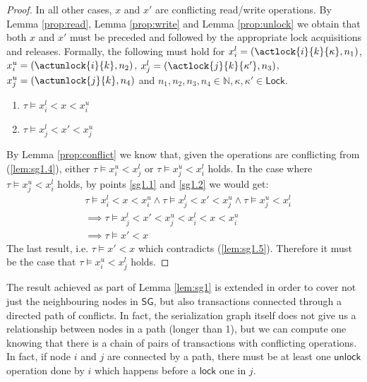 \begin{lem}
\begin{proof}
	In all other cases, $x$ and $x'$ are conflicting read/write operations. By Lemma \ref{prop:read}, Lemma \ref{prop:write} and Lemma \ref{prop:unlock} we obtain that both $x$ and $x'$ must be preceded and followed by the appropriate lock acquisitions and releases. Formally, the following must hold for $x_i^l = (\actlock{i}{k}{\kappa}, n_1)$, $x_i^u = (\actunlock{i}{k}, n_2)$, $x_j^l = (\actlock{j}{k}{\kappa'}, n_3)$, $x_j^u = (\actunlock{j}{k}, n_4)$ and $n_1, n_2, n_3, n_4 \in \mathds{N}, \kappa, \kappa' \in \mathsf{Lock}$.
	\begin{enumerate}
		\item \label{sg1.1} $\tau \vDash x_i^l < x < x_i^u$
		\item \label{sg1.2} $\tau \vDash x_j^l < x' < x_j^u$
	\end{enumerate}
	By Lemma \ref{prop:conflict} we know that, given the operations are conflicting from (\ref{lem:sg1.4}), either $\tau \vDash x_i^u < x_j^l$ or $\tau \vDash x_j^u < x_i^l$ holds. In the case where $\tau \vDash x_j^u < x_i^l$ holds, by points \ref{sg1.1} and \ref{sg1.2} we would get:
	\begin{align*}
		&\tau \vDash x_i^l < x < x_i^u \land \tau \vDash x_j^l < x' < x_j^u \land \tau \vDash x_j^u < x_i^l \\
		&\implies \tau \vDash x_j^l < x' < x_j^u < x_i^l < x < x_i^u
		\\
		&\implies \tau \vDash x' < x
	\end{align*}		
	 The last result, i.e. $\tau \vDash x' < x$ which contradicts (\ref{lem:sg1.5}). Therefore it must be the case that $\tau \vDash x_i^u < x_j^l$ holds.
	\end{proof}
\end{lem}

The result achieved as part of Lemma \ref{lem:sg1} is extended in order to cover not just the neighbouring nodes in $\mathsf{SG}$, but also transactions connected through a directed path of conflicts. In fact, the serialization graph itself does not give us a relationship between nodes in a path (longer than 1), but we can compute one knowing that there is a chain of pairs of transactions with conflicting operations. In fact, if node $i$ and $j$ are connected by a path, there must be at least one $\mathsf{unlock}$ operation done by $i$ which happens before a $\mathsf{lock}$ one in $j$.

